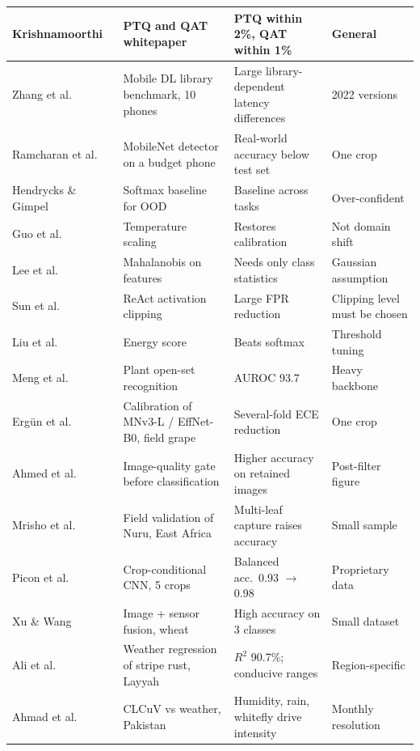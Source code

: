 \begin{longtable}{|L{2.6cm}|L{4.0cm}|L{4.2cm}|L{3.4cm}|}
Krishnamoorthi~\cite{krishnamoorthi2018quant} & PTQ and QAT whitepaper & PTQ within 2\%, QAT within 1\% & General \\ \hline
Zhang et al.~\cite{zhangq2022mobilebench} & Mobile DL library benchmark, 10 phones & Large library-dependent latency differences & 2022 versions \\ \hline
Ramcharan et al.~\cite{ramcharan2019cassava} & MobileNet detector on a budget phone & Real-world accuracy below test set & One crop \\ \hline
Hendrycks \& Gimpel~\cite{hendrycks2017msp} & Softmax baseline for OOD & Baseline across tasks & Over-confident \\ \hline
Guo et al.~\cite{guo2017calibration} & Temperature scaling & Restores calibration & Not domain shift \\ \hline
Lee et al.~\cite{lee2018mahalanobis} & Mahalanobis on features & Needs only class statistics & Gaussian assumption \\ \hline
Sun et al.~\cite{sun2021react} & ReAct activation clipping & Large FPR reduction & Clipping level must be chosen \\ \hline
Liu et al.~\cite{liu2020energy} & Energy score & Beats softmax & Threshold tuning \\ \hline
Meng et al.~\cite{meng2023osr} & Plant open-set recognition & AUROC 93.7 & Heavy backbone \\ \hline
Erg\"un et al.~\cite{ergun2026grape} & Calibration of MNv3-L / EffNet-B0, field grape & Several-fold ECE reduction & One crop \\ \hline
Ahmed et al.~\cite{ahmed2022agropath} & Image-quality gate before classification & Higher accuracy on retained images & Post-filter figure \\ \hline
Mrisho et al.~\cite{mrisho2020nuru} & Field validation of Nuru, East Africa & Multi-leaf capture raises accuracy & Small sample \\ \hline
Picon et al.~\cite{picon2019cropcond} & Crop-conditional CNN, 5 crops & Balanced acc.\ 0.93 $\to$ 0.98 & Proprietary data \\ \hline
Xu \& Wang~\cite{xuwang2025fusion} & Image + sensor fusion, wheat & High accuracy on 3 classes & Small dataset \\ \hline
Ali et al.~\cite{ali2023striperust} & Weather regression of stripe rust, Layyah & $R^2$ 90.7\%; conducive ranges & Region-specific \\ \hline
Ahmad et al.~\cite{ahmad2018clcuv} & CLCuV vs weather, Pakistan & Humidity, rain, whitefly drive intensity & Monthly resolution \\ \hline

\end{longtable}
